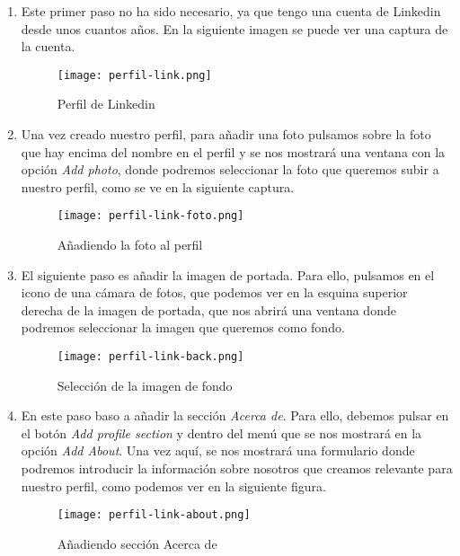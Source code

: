 \begin{enumerate}
    \item Este primer paso no ha sido necesario, ya que tengo una cuenta de Linkedin desde unos cuantos años. En la siguiente imagen se puede ver una captura de la cuenta.

    \begin{figure}[H]
        \centering
        \texttt{[image: perfil-link.png]}
        \caption{Perfil de Linkedin}
    \end{figure}

    \item Una vez creado nuestro perfil, para añadir una foto pulsamos sobre  la foto que hay encima del nombre en el perfil y se nos mostrará una ventana con la opción \textit{Add photo}, donde podremos seleccionar la foto que queremos subir a nuestro perfil, como se ve en la siguiente captura.

    \begin{figure}[H]
        \centering
        \texttt{[image: perfil-link-foto.png]}
        \caption{Añadiendo la foto al perfil}
    \end{figure}

    \item El siguiente paso es añadir la imagen de portada. Para ello, pulsamos en el icono de una cámara de fotos, que podemos ver en la esquina superior derecha de la imagen de portada, que nos abrirá una ventana donde podremos seleccionar la imagen que queremos como fondo.

    \begin{figure}[H]
        \centering
        \texttt{[image: perfil-link-back.png]}
        \caption{Selección de la imagen de fondo}
    \end{figure}

    \item En este paso baso a añadir la sección \textit{Acerca de}. Para ello, debemos pulsar en el botón \textit{Add profile section} y dentro del menú que se nos mostrará en la opción \textit{Add About}. Una vez aquí, se nos mostrará una formulario donde podremos introducir la información sobre nosotros que creamos relevante para nuestro perfil, como podemos ver en la siguiente figura.

    \begin{figure}[H]
        \centering
        \texttt{[image: perfil-link-about.png]}
        \caption{Añadiendo sección Acerca de}
    \end{figure}


\end{enumerate}
